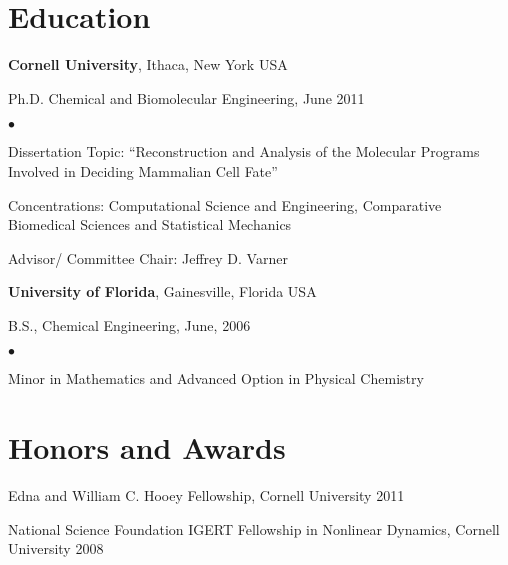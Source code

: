 \documentclass[margin,line]{res}
\newenvironment{list1}{
  \begin{list}{\ding{113}}{%
      \setlength{\itemsep}{0in}
      \setlength{\parsep}{0in} \setlength{\parskip}{0in}
      \setlength{\topsep}{0in} \setlength{\partopsep}{0in} 
      \setlength{\leftmargin}{0.17in}}}{\end{list}}
\newenvironment{list2}{
  \begin{list}{$\bullet$}{%
      \setlength{\itemsep}{0in}
      \setlength{\parsep}{0in} \setlength{\parskip}{0in}
      \setlength{\topsep}{0in} \setlength{\partopsep}{0in} 
      \setlength{\leftmargin}{0.2in}}}{\end{list}}
\begin{document}
\begin{resume}
\section{\sc Education}
{\bf Cornell University}, Ithaca, New York USA\\
\vspace*{-.1in}
\begin{list1}
\item[] Ph.D. Chemical and Biomolecular Engineering, June 2011
\begin{list2}
\vspace*{.05in}
\item Dissertation Topic:  ``Reconstruction and Analysis of the Molecular 
Programs Involved in Deciding Mammalian Cell Fate'' 
\item Concentrations: Computational Science and Engineering, Comparative Biomedical Sciences and Statistical Mechanics 
\item Advisor/ Committee Chair:  Jeffrey D. Varner
\end{list2}
\end{list1}

{\bf University of Florida}, Gainesville, Florida USA\\
\vspace*{-.1in}
\begin{list1}
\item[] B.S., Chemical Engineering,  June, 2006
\begin{list2}
\vspace*{.05in}
\item Minor in Mathematics and Advanced Option in Physical Chemistry
\end{list2}
\end{list1}


\section{\sc Honors and Awards}
Edna and William C. Hooey Fellowship, Cornell University 2011

\vspace*{-2.5mm}
National Science Foundation IGERT Fellowship in Nonlinear Dynamics, Cornell University 2008


\end{resume}
\end{document}
